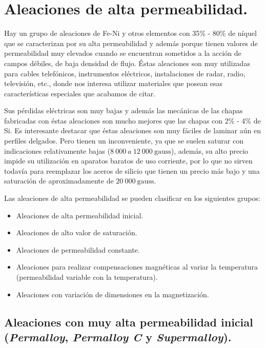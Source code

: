 \documentclass[12pt,a4paper]{article}
\begin{document}
\section{Aleaciones de alta permeabilidad.}

Hay un grupo de aleaciones de Fe-Ni y otros elementos con 35\% - 80\% de níquel que se caracterizan por su alta permeabilidad y además porque tienen valores de permeabilidad muy elevados cuando se encuentran sometidos a la acción de campos débiles, de baja densidad de flujo. Éstas aleaciones son muy utilizadas para cables telefónicos, instrumentos eléctricos, instalaciones de radar, radio, televisión, etc., donde nos interesa utilizar materiales que posean esas características especiales que acabamos de citar.

Sus pérdidas eléctricas son muy bajas y además las mecánicas de las chapas fabricadas con éstas aleaciones son mucho mejores que las chapas con 2\% - 4\% de Si. Es interesante destacar que éstas aleaciones son muy fáciles de laminar aún en perfiles delgados. Pero tienen un inconveniente, ya que se suelen saturar con indicaciones relativamente bajas ($8\ 000\ a\ 12\ 000\ \mathrm{gauss}$), además, su alto precio impide su utilización en aparatos baratos de uso corriente, por lo que no sirven todavía para reemplazar los aceros de silicio que tienen un precio más bajo y una saturación de aproximadamente de $20\ 000\ \mathrm{gauss}$.

Las aleaciones de alta permeabilidad se pueden clasificar en los siguientes grupos:

\begin{itemize}
    \item Aleaciones de alta permeabilidad inicial.
    \item Aleaciones de alto valor de saturación.
    \item Aleaciones de permeabilidad constante.
    \item Aleaciones para realizar compensaciones magnéticas al variar la temperatura (permeabilidad variable con la temperatura).
    \item Aleaciones con variación de dimensiones en la magnetización.
\end{itemize}

\subsection{Aleaciones con muy alta permeabilidad inicial (\textit{Permalloy}, \textit{Permalloy C} y \textit{Supermalloy}).}
\end{document}
